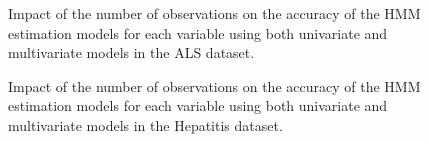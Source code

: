 \begin{figure}[h]
 	\begin{subfigmatrix}{2}
 	\end{subfigmatrix}
 	\caption{Impact of the number of observations on the accuracy of the HMM estimation models for each variable using both univariate and multivariate models in the ALS dataset.}
 	\label{fig:estimationhmmals}
 \end{figure}
 
\begin{figure}[h]
  \begin{subfigmatrix}{2}
  \end{subfigmatrix}
  \caption{Impact of the number of observations on the accuracy of the HMM estimation models for each variable using both univariate and multivariate models in the Hepatitis dataset.}
  \label{fig:estimationhmmh}
\end{figure}

